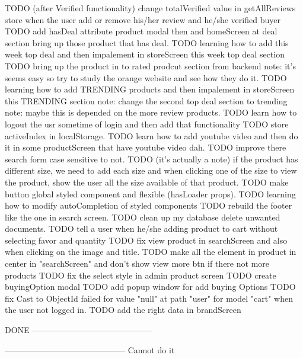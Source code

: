 TODO   (after Verified functionality) change totalVerified value in getAllReviews store when the user add or remove his/her review and he/she verified buyer
TODO   add hasDeal attribute product modal then and homeScreen at deal section bring up those product that has deal.
TODO   learning how to add this week top deal and then impalement in storeScreen this week top deal section
TODO   bring up the product in to rated prodcut section from backend 
      note: it's seems easy so try to study the orange website and see how they do it.
TODO   learning how to add TRENDING products and then impalement in storeScreen this TRENDING section
      note: change the second top deal section to trending 
      note: maybe this is depended on the more review products.
TODO   learn how to logout the usr sometime of login and then add that functionality
TODO   store activeIndex in localStorage.
TODO   learn how to add youtube video and then do it in some productScreen that have youtube video dah.
TODO   improve there search form case sensitive to not.
TODO   (it's actually a note) if the product has different size, we need to add each size and when
          clicking one of the size to view the product, show the user all the size available of that product.
TODO   make button global styled component and flexible (hasLoader props).
TODO   learning how to modify autoCompletion of styled components 
TODO   rebuild the footer like the one in search screen.
TODO   clean up my database delete unwanted documents.
TODO   tell a user when he/she adding product to cart without selecting favor and quantity
TODO   fix view product in searchScreen and also when clicking on the image and title.
TODO   make all the element in product in center in "searchScreen" and don't show view more btn if there not more products
TODO   fix the select style in admin product screen
TODO   create buyingOption modal 
TODO   add popup window for add buying Options
TODO   fix Cast to ObjectId failed for value "null" at path "user" for model "cart" when the user not logged in.
TODO   add the right data in brandScreen 

DONE
--------------------------------------------



--------------------------------------------
Cannot do it

